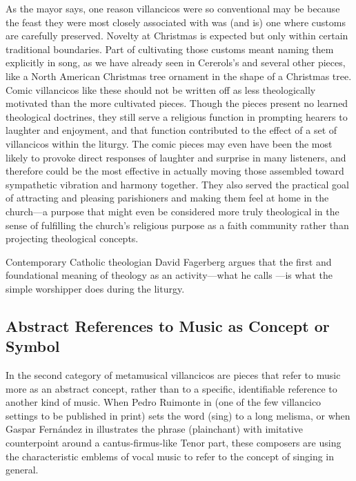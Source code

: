 As the mayor says, one reason villancicos were so conventional may be because
the feast they were most closely associated with was (and is) one where customs
are carefully preserved.
Novelty at Christmas is expected but only within certain traditional
boundaries.
Part of cultivating those customs meant naming them explicitly in song, as we
have already seen in Cererols's  and several
other pieces, like a North American Christmas tree ornament in the shape of a
Christmas tree.
Comic villancicos like these should not be written off as less theologically
motivated than the more cultivated pieces.
Though the  pieces present no learned theological
doctrines, they still serve a religious function in prompting hearers to
laughter and enjoyment, and that function contributed to the effect of a set of
villancicos within the liturgy.
The comic pieces may even have been the most likely to provoke direct responses
of laughter and surprise in many listeners, and therefore could be the most
effective in actually moving those assembled toward sympathetic vibration and
harmony together. 
They also served the practical goal of attracting and pleasing parishioners and
making them feel at home in the church---a purpose that might even be
considered more truly theological in the sense of fulfilling the church's
religious purpose as a faith community rather than projecting theological
concepts.%
\begin{Footnote}
    Contemporary Catholic theologian David Fagerberg argues that the first
    and foundational meaning of theology as an activity---what he calls
    ---is what the simple worshipper does during the
    liturgy.
\end{Footnote}

\subsection{Abstract References to Music as Concept or Symbol}

In the second category of metamusical villancicos are pieces that refer to
music more as an abstract concept, rather than to a specific, identifiable
reference to another kind of music.
When Pedro Ruimonte in  (one of the few villancico
settings to be published in print) sets the word  (sing) to a
long melisma, or when Gaspar Fernández in 
illustrates the phrase  (plainchant) with imitative
counterpoint around a cantus-firmus-like Tenor part, these composers are using
the characteristic emblems of vocal music to refer to the concept of singing in
general.%
    \citXXX[ruimonte, fernandez]

